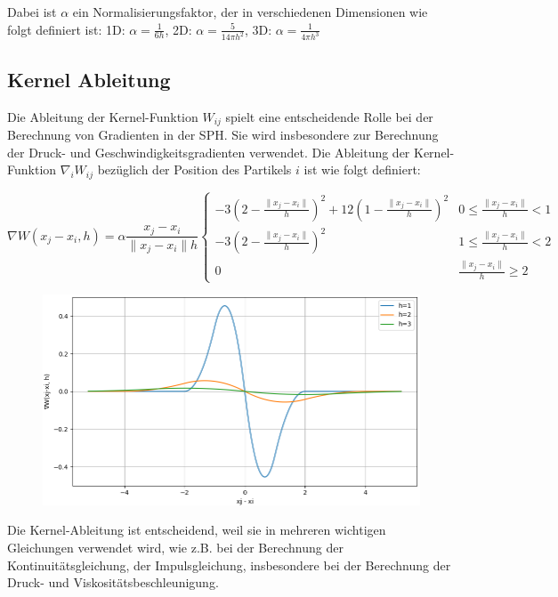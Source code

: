 \documentclass[a4paper, 12pt]{article}
\begin{document}
Dabei ist \(\alpha\) ein Normalisierungsfaktor, der in verschiedenen Dimensionen wie folgt definiert ist:
1D: \(\alpha = \frac{1}{6h}\), 2D: \(\alpha = \frac{5}{14\pi h^2}\), 3D: \(\alpha = \frac{1}{4\pi h^3}\)

\subsection{Kernel Ableitung}
Die Ableitung der Kernel-Funktion $W_{ij}$ spielt eine entscheidende Rolle bei der Berechnung von Gradienten in der SPH. Sie wird insbesondere zur Berechnung der Druck- und Geschwindigkeitsgradienten verwendet. Die Ableitung der Kernel-Funktion $\nabla_i W_{ij}$ bezüglich der Position des Partikels $i$ ist wie folgt definiert:

\begin{equation*}
	\nabla W(x_j - x_i, h) = \alpha \frac{x_j - x_i}{\|x_j - x_i\|h} 
	\begin{cases} 
	-3(2-\frac{\|x_j - x_i\|}{h})^2 + 12(1-\frac{\|x_j - x_i\|}{h})^2 & 0 \leq \frac{\|x_j - x_i\|}{h} < 1 \\ 
	-3(2-\frac{\|x_j - x_i\|}{h})^2 & 1 \leq \frac{\|x_j - x_i\|}{h} < 2 \\ 
	0 & \frac{\|x_j - x_i\|}{h} \geq 2 
	\end{cases}
\end{equation*}	

\begin{figure}[H]
	\centering
	\includegraphics[width=\textwidth]{graphics/KernelDerivPlot.png}
\end{figure}

Die Kernel-Ableitung ist entscheidend, weil sie in mehreren wichtigen Gleichungen verwendet wird, wie z.B. bei der Berechnung der Kontinuitätsgleichung, der Impulsgleichung, insbesondere bei der Berechnung der Druck- und Viskositätsbeschleunigung.
\end{document}
